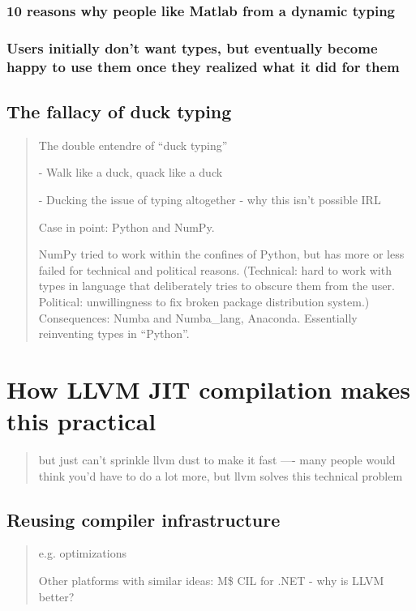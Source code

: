 \documentclass[12pt]{mitthesis}
\begin{document}
\subsection{10 reasons why people like Matlab from a dynamic typing}


\subsection{Users initially don't want types, but eventually become happy to
use them once they realized what it did for them}


\section{The fallacy of duck typing}
\begin{quotation}
The double entendre of ``duck typing''

- Walk like a duck, quack like a duck

- Ducking the issue of typing altogether - why this isn't possible
IRL

Case in point: Python and NumPy.

NumPy tried to work within the confines of Python, but has more or
less failed for technical and political reasons. (Technical: hard
to work with types in language that deliberately tries to obscure
them from the user. Political: unwillingness to fix broken package
distribution system.) Consequences: Numba and Numba\_lang, Anaconda.
Essentially reinventing types in ``Python''. 
\end{quotation}

\chapter{How LLVM JIT compilation makes this practical}
\begin{quotation}
but just can\textquoteright{}t sprinkle llvm dust to make it fast
---- many people would think you\textquoteright{}d have to do a lot
more, but llvm solves this technical problem
\end{quotation}

\section{Reusing compiler infrastructure}
\begin{quotation}
e.g. optimizations

Other platforms with similar ideas: M\$ CIL for .NET - why is LLVM
better?
\end{quotation}
\end{document}
